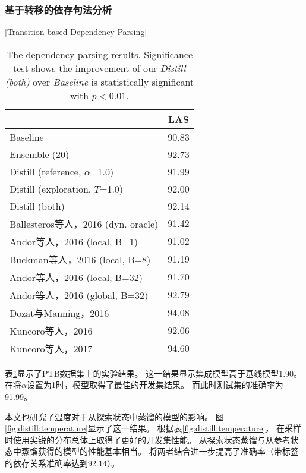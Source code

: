 \subsubsection{基于转移的依存句法分析}[Transition-based Dependency Parsing]
\begin{table}[t]
	\centering
	\begin{tabular}{lc}
		\hline
		& LAS \\
		\hline
		Baseline & 90.83  \\
		Ensemble (20) & 92.73 \\
		Distill (reference, $\alpha$=1.0) & 91.99 \\
		Distill (exploration, $T$=1.0) & 92.00 \\
		Distill (both) & 92.14 \\
		\hdashline
		Ballesteros等人，2016\cite{ballesteros-EtAl:2016:EMNLP2016}  (dyn. oracle) & 91.42 \\
		Andor等人，2016\cite{andor-EtAl:2016:P16-1} (local, B=1) & 91.02 \\
		\hdashline
		Buckman等人，2016\cite{buckman-ballesteros-dyer:2016:EMNLP2016} (local, B=8) & 91.19 \\
		Andor等人，2016\cite{andor-EtAl:2016:P16-1} (local, B=32) & 91.70 \\
		Andor等人，2016\cite{andor-EtAl:2016:P16-1} (global, B=32) & 92.79 \\
		Dozat与Manning，2016\cite{DBLP:journals/corr/DozatM16} & 94.08 \\
		Kuncoro等人，2016\cite{kuncoro-16} & 92.06 \\
		Kuncoro等人，2017\cite{kuncoro-17} & 94.60 \\
		\hline
	\end{tabular}
	\caption{The dependency parsing results. 
		Significance test \cite{NILSSON08.52} shows the improvement of our \textit{Distill (both)} over \textit{Baseline}
		is statistically significant with $p<0.01$.}\label{tbl:distill:parse-res}
\end{table}

表\ref{tbl:distill:parse-res}显示了PTB数据集上的实验结果。
这一结果显示集成模型高于基线模型1.90。
在将$\alpha$设置为1时，模型取得了最佳的开发集结果。
而此时测试集的准确率为91.99。

本文也研究了温度对于从探索状态中蒸馏的模型的影响。
图\ref{fig:distill:temperature}显示了这一结果。
根据表\ref{fig:distill:temperature}，
在采样时使用尖锐的分布总体上取得了更好的开发集性能。
从探索状态蒸馏与从参考状态中蒸馏获得的模型的性能基本相当。
将两者结合进一步提高了准确率（带标签的依存关系准确率达到92.14）。

